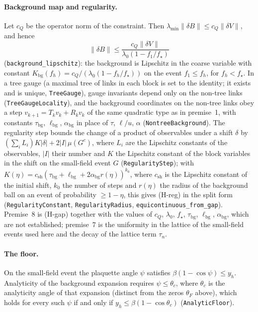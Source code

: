 \documentclass[11pt,a4paper]{article}
\theoremstyle{definition}
\theoremstyle{remark}
\newcommand{\lt}[1]{\texttt{#1}}
\begin{document}
\paragraph{Background map and regularity.} Let $c_Q$ be the operator norm of the constraint. Then $\lambda_{\min}\|\delta B\|\le c_Q\|\delta V\|$, and hence
\[\|\delta B\|\le\frac{c_Q\|\delta V\|}{\lambda_0(1-f_1/f_\star)}\]
(\lt{background\_\allowbreak{}lipschitz}): the background is Lipschitz in the coarse variable with constant $K_{\mathrm{bg}}(f_h)=c_Q/(\lambda_0(1-f_h/f_\star))$ on the event $f_1\le f_h$, for $f_h<f_\star$. In a tree gauge (a maximal tree of links in each block is set to the identity; it exists and is unique, \lt{TreeGauge}), gauge invariants depend only on the non-tree links (\lt{TreeGaugeLocality}), and the background coordinates on the non-tree links obey a step $v_{k+1}=T_kv_k+R_kv_k$ of the same quadratic type as in premise~1, with constants $\tau_{\mathrm{bg}}$, $\ell_{\mathrm{bg}}$, $\alpha_{\mathrm{bg}}$ in place of $\tau$, $\ell/u$, $\alpha$ (\lt{NontreeBackground}). The regularity step bounds the change of a product of observables under a shift $\delta$ by $(\sum_iL_i)K|\delta|+2|I|\,\mu(G^c)$, where $L_i$ are the Lipschitz constants of the observables, $|I|$ their number and $K$ the Lipschitz constant of the block variables in the shift on the small-field event $G$ (\lt{RegularityStep}); with $K(\eta)=c_{\mathrm{sh}}(\tau_{\mathrm{bg}}+\ell_{\mathrm{bg}}+2\alpha_{\mathrm{bg}}r(\eta))^{k_0}$, where $c_{\mathrm{sh}}$ is the Lipschitz constant of the initial shift, $k_0$ the number of steps and $r(\eta)$ the radius of the background ball on an event of probability $\ge1-\eta$, this gives (H-reg) in the split form (\lt{RegularityConstant}, \lt{RegularityRadius}, \lt{equicontinuous\_\allowbreak{}from\_\allowbreak{}gap}). Premise~8 is (H-gap) together with the values of $c_Q$, $\lambda_0$, $f_\star$, $\tau_{\mathrm{bg}}$, $\ell_{\mathrm{bg}}$, $\alpha_{\mathrm{bg}}$, which are not established; premise~7 is the uniformity in the lattice of the small-field events used here and the decay of the lattice term $\tau_n$.

\paragraph{The floor.} On the small-field event the plaquette angle $\psi$ satisfies $\beta(1-\cos\psi)\le y_h$. Analyticity of the background expansion requires $\psi\le\theta_c$, where $\theta_c$ is the analyticity angle of that expansion (distinct from the zeros $\theta_F$ above), which holds for every such $\psi$ if and only if $y_h\le\beta(1-\cos\theta_c)$ (\lt{AnalyticFloor}).
\end{document}
